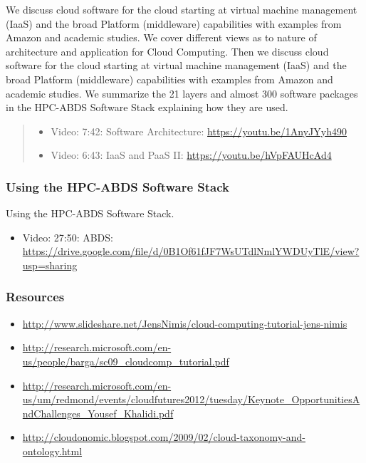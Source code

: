 We discuss cloud software for the cloud starting at virtual machine
management (IaaS) and the broad Platform (middleware) capabilities with
examples from Amazon and academic studies. We cover different views as
to nature of architecture and application for Cloud Computing. Then we
discuss cloud software for the cloud starting at virtual machine
management (IaaS) and the broad Platform (middleware) capabilities with
examples from Amazon and academic studies. We summarize the 21 layers
and almost 300 software packages in the HPC-ABDS Software Stack
explaining how they are used.

\begin{quote}
\begin{itemize}
\item
  Video: 7:42: Software Architecture: \url{https://youtu.be/1AnyJYyh490}
\item
  Video: 6:43: IaaS and PaaS II: \url{https://youtu.be/hVpFAUHcAd4}
\end{itemize}
\end{quote}

\subsubsection{Using the HPC-ABDS Software Stack}

Using the HPC-ABDS Software Stack.

\begin{itemize}
\item
  Video: 27:50: ABDS:
  \url{https://drive.google.com/file/d/0B1Of61fJF7WsUTdlNmlYWDUyTlE/view?usp=sharing}
\end{itemize}

\subsubsection{Resources}\label{resources-2}

\begin{itemize}
\tightlist
\item
  \url{http://www.slideshare.net/JensNimis/cloud-computing-tutorial-jens-nimis}
\item
  \url{http://research.microsoft.com/en-us/people/barga/sc09_cloudcomp_tutorial.pdf}
\item
  \url{http://research.microsoft.com/en-us/um/redmond/events/cloudfutures2012/tuesday/Keynote_OpportunitiesAndChallenges_Yousef_Khalidi.pdf}
\item
  \url{http://cloudonomic.blogspot.com/2009/02/cloud-taxonomy-and-ontology.html}
\end{itemize}

